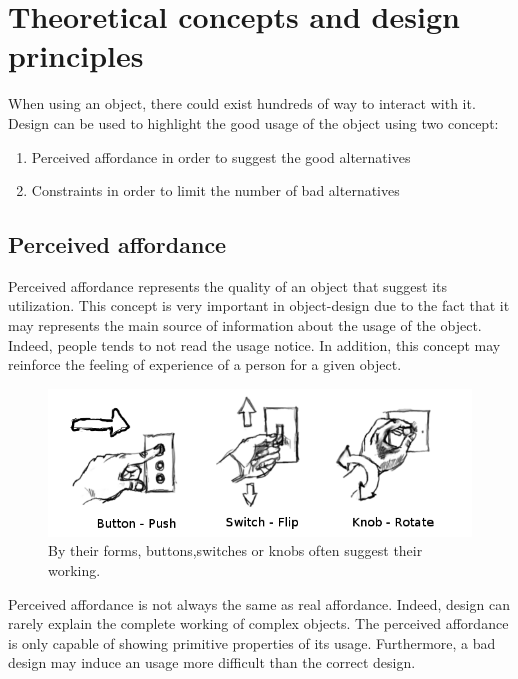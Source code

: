 \documentclass[a4paper,11pt] {article}
\theoremstyle{definition}
\begin{document}
\section{Theoretical concepts and design principles}
When using an object, there could exist hundreds of way to interact with it. Design can be used to highlight the good usage of the object using two concept:
\begin{enumerate}
\item Perceived affordance in order to suggest the good alternatives
\item Constraints in order to limit the number of bad alternatives
\end{enumerate}

\label{sct:theory}

    \subsection{Perceived affordance}

Perceived affordance represents the quality of an object that suggest its utilization. This concept is very important in object-design due to the fact that it may represents the main source of information about the usage of the object. Indeed, people tends to not read the usage notice. In addition, this concept may reinforce the feeling of experience of a person for a given object.

\begin{figure}[h]
\centering
\includegraphics[scale=0.40]{fig-report/switches-only.png}
\caption{By their forms, buttons,switches or knobs often suggest their working.}
\end{figure}

Perceived affordance is not always the same as real affordance. Indeed, design can rarely explain the complete working of complex objects. The perceived affordance is only capable of showing primitive properties of its usage. Furthermore, a bad design may induce an usage more difficult than the correct design\cite{affordancesMads}.
\end{document}
